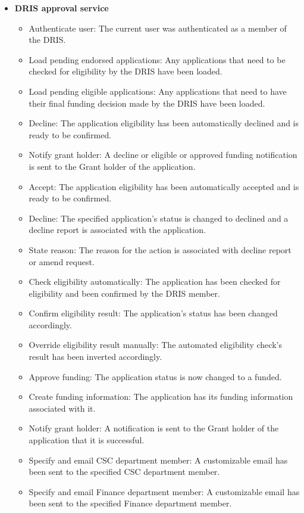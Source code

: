 \documentclass[12pt]{article}
\begin{document}
\begin{itemize}
	\item \textbf{DRIS approval service}
		\begin{itemize}
			\item Authenticate user: The current user was authenticated as a member of the DRIS.
			\item Load pending endorsed applications: Any applications that need to be checked for eligibility by the DRIS have been loaded.
			\item Load pending eligible applications: Any applications that need to have their final funding decision made by the DRIS have been loaded.			 
			\item Decline: The application eligibility has been automatically declined and is ready to be confirmed. 
			\item Notify grant holder: A decline or eligible or approved funding notification is sent to the Grant holder of the application.
			\item Accept: The application eligibility has been automatically accepted and is ready to be confirmed.			
			\item Decline: The specified application's status is changed to declined and a decline report is associated with the application.			
			\item State reason: The reason for the action is associated with decline report or amend request.			
			\item Check eligibility automatically: The application has been checked for eligibility and been confirmed by the DRIS member.
			\item Confirm eligibility result: The application's status has been changed accordingly. 
			\item Override eligibility result manually: The automated eligibility check's result has been inverted accordingly.
			\item Approve funding: The application status is now changed to a funded.
			\item Create funding information: The application has its funding information associated with it.
			\item Notify grant holder: A notification is sent to the Grant holder of the application that it is successful.
			\item Specify and email CSC department member: A customizable email has been sent to the specified CSC department member.
			\item Specify and email Finance department member: A customizable email has been sent to the specified Finance department member.									
		\end{itemize}
	

\end{itemize}
\end{document}
